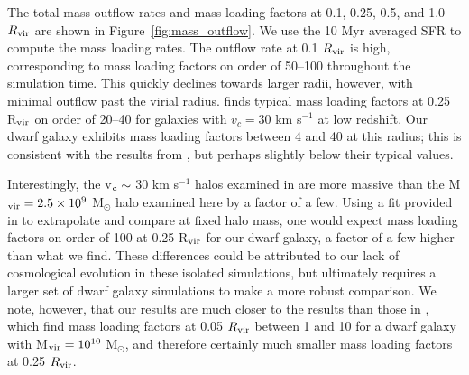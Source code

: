 \documentclass[twocolumn]{aastex61}
\begin{document}
The total mass outflow rates and mass loading factors at 0.1, 0.25, 0.5, and 1.0 $R_{\rm vir}$ are shown in Figure~\ref{fig:mass_outflow}. We use the 10 Myr averaged SFR to compute the mass loading rates. The outflow rate at 0.1 $R_{\rm vir}$ is high, corresponding to mass loading factors on order of 50--100 throughout the simulation time. This quickly declines towards larger radii, however, with minimal outflow past the virial radius. \citet{Muratov2015} finds typical mass loading factors at 0.25 R$_{\rm vir}$ on order of 20--40 for galaxies with $v_{c} = 30$ km s$^{-1}$ at low redshift. Our dwarf galaxy exhibits mass loading factors between 4 and 40 at this radius; this is consistent with the results from \citet{Muratov2015}, but perhaps slightly below their typical values. 

Interestingly, the v$_{\rm c}\sim$ 30 km s$^{-1}$ halos examined in \citet{Muratov2015} are more massive than the M$_{\rm vir} = 2.5\times 10^9$ M$_{\odot}$ halo examined here by a factor of a few. Using a fit provided in \citet{Muratov2015} to extrapolate and compare at fixed halo mass, one would expect mass loading factors on order of 100 at 0.25 R$_{\rm vir}$ for our dwarf galaxy, a factor of a few higher than what we find. These differences could be attributed to our lack of cosmological evolution in these isolated simulations, but ultimately requires a larger set of dwarf galaxy simulations to make a more robust comparison. We note, however, that our results are much closer to the \citep{Muratov2015} results than those in \citet{Hu2016,Hu2017}, which find mass loading factors at 0.05 $R_{\rm vir}$ between 1 and 10 for a dwarf galaxy with M$_{\rm vir} = 10^{10}$ M$_{\odot}$, and therefore certainly much smaller mass loading factors at 0.25 $R_{\rm vir}$.
\end{document}
